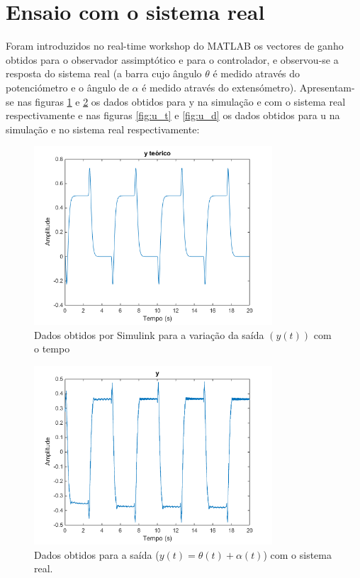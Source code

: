 \documentclass[%
  reprint,
  nofootinbib,
  amsmath,amssymb,
  aps,
  10pt,
  a4paper
]{revtex4-1}
\begin{document}
\section{Ensaio com o sistema real}
Foram introduzidos no real-time workshop do MATLAB os vectores de ganho obtidos para o observador assimptótico e para o controlador, e observou-se a resposta do sistema real (a barra cujo ângulo $\theta$ é medido através do potenciómetro e o ângulo de $\alpha$ é medido através do extensómetro). Apresentam-se nas figuras \ref{fig:y_t} e \ref{fig:y_d} os dados obtidos para y na simulação e com o sistema real respectivamente e nas figuras \ref{fig:u_t} e \ref{fig:u_d} os dados obtidos para u na simulação e no sistema real respectivamente:
\begin{figure}
\includegraphics[width=3.5in]{../img/y.png}
\caption{Dados obtidos por Simulink para a variação da saída $(y(t))$ com o tempo}
\label{fig:y_t}
\end{figure}
\begin{figure}
\includegraphics[width=3.5in]{../img/y_dados_01.png}
\caption{Dados obtidos para a saída ($y(t)=\theta(t)+\alpha(t)$) com o sistema real.}
\label{fig:y_d}
\end{figure}
\end{document}
